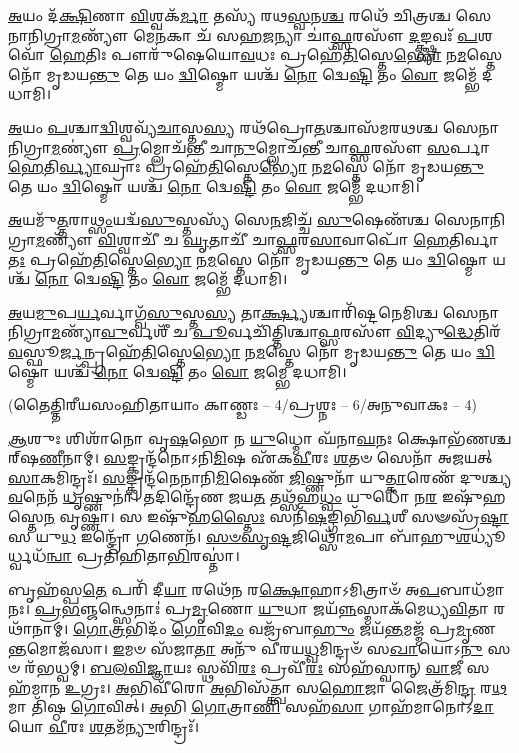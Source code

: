\-\ul{𑌅}\-𑌯𑌂 𑌦᳴\-\ul{𑌕𑍍𑌷𑌿}\-𑌣𑌾 \ul{𑌵𑌿}\-𑌶𑍍𑌵𑌕᳴\-\ul{𑌰𑍍𑌮𑌾} 𑌤𑌸𑍍𑌯᳴ 𑌰𑌥\-\ul{𑌸𑍍𑌵}\-𑌨\-\ul{𑌶𑍍𑌚} 𑌰𑌥𑍇᳴ 𑌚𑌿𑌤𑍍𑌰𑌶𑍍𑌚  𑌸𑍇𑌨𑌾𑌨𑌿𑌗𑍍𑌰𑌾\-\ul{𑌮}\-𑌣𑍍𑌯𑍗᳴
𑌮𑍇\-\ul{𑌨}\-𑌕𑌾 𑌚᳴ 𑌸𑌹\-\ul{𑌜}\-𑌨𑍍𑌯𑌾 𑌚𑌾॑\-\ul{𑌫𑍍𑌸}\-𑌰𑌸𑍗᳴ \ul{𑌦}\-𑌙𑍍𑌕𑍍𑌷𑍍𑌣𑌵𑌃᳴ \ul{𑌪}\-𑌶𑌵𑍋᳴ \ul{𑌹𑍇}\-𑌤𑌿𑌃 𑌪𑍗𑌰𑍁᳴𑌷𑍇𑌯𑍋\-\ul{𑌵}\-𑌧𑌃
𑌪𑍍𑌰𑌹𑍇᳴\-\ul{𑌤𑌿}\-𑌸𑍍𑌤𑍇\-\ul{𑌭𑍍𑌯𑍋} 𑌨\-\ul{𑌮}\-𑌸𑍍𑌤𑍇 𑌨𑍋᳴ 𑌮𑍃𑌡𑌯\-\ul{𑌨𑍍𑌤𑍁} 𑌤𑍇 𑌯𑌂 \ul{𑌦𑍍𑌵𑌿}\-𑌷𑍍𑌮𑍋 𑌯𑌶𑍍𑌚᳴ \ul{𑌨𑍋} 𑌦𑍍𑌵𑍇\-\ul{𑌷𑍍𑌟𑌿} 𑌤𑌂 \ul{𑌵𑍋}  𑌜𑌮𑍍𑌭𑍇᳴ 𑌦𑌧𑌾𑌮𑌿।

\-\ul{𑌅}\-𑌯𑌂 \ul{𑌪}\-𑌶𑍍𑌚𑌾\-\ul{𑌦𑍍𑌵𑌿}\-𑌶𑍍𑌵𑌵𑍍𑌯᳴\-\ul{𑌚𑌾}\-𑌸𑍍𑌤\-\ul{𑌸𑍍𑌯} 𑌰𑌥᳴𑌪𑍍𑌰𑍋\-\ul{𑌤}\-𑌶𑍍𑌚𑌾𑌸᳴𑌮𑌰𑌥𑌶𑍍𑌚 𑌸𑍇𑌨𑌾𑌨𑌿𑌗𑍍𑌰𑌾\-\ul{𑌮}\-𑌣𑍍𑌯𑍗॑
\-\ul{𑌪𑍍𑌰}\-𑌮𑍍𑌲𑍋𑌚᳴𑌨𑍍𑌤𑍀 𑌚𑌾\-\ul{𑌨𑍁}\-𑌮𑍍𑌲𑍋𑌚᳴𑌨𑍍𑌤𑍀 𑌚𑌾\-\ul{𑌫𑍍𑌸}\-𑌰𑌸𑍗᳴ \ul{𑌸}\-𑌰𑍍𑌪𑌾 \ul{𑌹𑍇}\-𑌤𑌿\-\ul{𑌰𑍍𑌵𑍍𑌯𑌾}\-𑌘𑍍𑌰𑌾𑌃 
𑌪𑍍𑌰𑌹𑍇᳴\-\ul{𑌤𑌿}\-𑌸𑍍𑌤𑍇\-\ul{𑌭𑍍𑌯𑍋} 𑌨\-\ul{𑌮}\-𑌸𑍍𑌤𑍇 𑌨𑍋᳴ 𑌮𑍃𑌡𑌯\-\ul{𑌨𑍍𑌤𑍁} 𑌤𑍇 𑌯𑌂 \ul{𑌦𑍍𑌵𑌿}\-𑌷𑍍𑌮𑍋 𑌯𑌶𑍍𑌚᳴ \ul{𑌨𑍋} 𑌦𑍍𑌵𑍇\-\ul{𑌷𑍍𑌟𑌿} 𑌤𑌂 \ul{𑌵𑍋}  𑌜𑌮𑍍𑌭𑍇᳴ 𑌦𑌧𑌾𑌮𑌿।

\-\ul{𑌅}\-𑌯𑌮𑍁᳴\-\ul{𑌤𑍍𑌤}\-𑌰𑌾\-\ul{𑌥𑍍𑌸𑌂}\-𑌯𑌦𑍍𑌵᳴\-\ul{𑌸𑍁}\-𑌸𑍍𑌤𑌸𑍍𑌯᳴ 𑌸𑍇\-\ul{𑌨}\-𑌜𑌿𑌚𑍍𑌚᳴ \ul{𑌸𑍁}\-𑌷𑍇𑌣᳴𑌶𑍍𑌚 𑌸𑍇𑌨𑌾𑌨𑌿𑌗𑍍𑌰𑌾\-\ul{𑌮}\-𑌣𑍍𑌯𑍗᳴
\-\ul{𑌵𑌿}\-𑌶𑍍𑌵𑌾𑌚𑍀᳴ 𑌚 \ul{𑌘𑍃}\-𑌤𑌾𑌚𑍀᳴ 𑌚𑌾\-\ul{𑌫𑍍𑌸}\-𑌰\-\ul{𑌸𑌾}\-𑌵𑌾𑌪𑍋᳴ \ul{𑌹𑍇}\-𑌤𑌿𑌰𑍍𑌵𑌾\-\ul{𑌤𑌃} 
𑌪𑍍𑌰𑌹𑍇᳴\-\ul{𑌤𑌿}\-𑌸𑍍𑌤𑍇\-\ul{𑌭𑍍𑌯𑍋} 𑌨\-\ul{𑌮}\-𑌸𑍍𑌤𑍇 𑌨𑍋᳴ 𑌮𑍃𑌡𑌯\-\ul{𑌨𑍍𑌤𑍁} 𑌤𑍇 𑌯𑌂 \ul{𑌦𑍍𑌵𑌿}\-𑌷𑍍𑌮𑍋 𑌯𑌶𑍍𑌚᳴ \ul{𑌨𑍋} 𑌦𑍍𑌵𑍇\-\ul{𑌷𑍍𑌟𑌿} 𑌤𑌂 \ul{𑌵𑍋}  𑌜𑌮𑍍𑌭𑍇᳴ 𑌦𑌧𑌾𑌮𑌿।

\-\ul{𑌅}\-𑌯\-\ul{𑌮𑍁}\-𑌪\-\ul{𑌰𑍍𑌯}\-𑌰𑍍𑌵𑌾𑌗𑍍𑌵᳴\-\ul{𑌸𑍁}\-𑌸𑍍𑌤\-\ul{𑌸𑍍𑌯} 𑌤𑌾\-\ul{𑌰𑍍𑌕𑍍𑌷𑍍𑌯}\-𑌶𑍍𑌚𑌾𑌰𑌿᳴𑌷𑍍𑌟𑌨𑍇𑌮𑌿𑌶𑍍𑌚  𑌸𑍇𑌨𑌾𑌨𑌿\-𑌗𑍍𑌰𑌾\-\ul{𑌮}\-𑌣𑍍𑌯𑌾᳴\-\ul{𑌵𑍁}\-𑌰𑍍𑌵𑌶𑍀᳴ 𑌚
\-\ul{𑌪𑍂}\-𑌰𑍍𑌵𑌚𑌿᳴𑌤𑍍𑌤𑌿𑌶𑍍𑌚𑌾\-\ul{𑌫𑍍𑌸}\-𑌰𑌸𑍗᳴ \ul{𑌵𑌿}\-𑌦𑍍𑌯𑍁\-\ul{𑌦𑍍𑌧𑍇}\-𑌤𑌿𑌰᳴\-\ul{𑌵}\-\-𑌸𑍍𑌫𑍂\-\ul{𑌰𑍍𑌜}\-𑌨𑍍𑌪𑍍𑌰𑌹𑍇᳴\-\ul{𑌤𑌿}\-𑌸𑍍𑌤𑍇\-\ul{𑌭𑍍𑌯𑍋}\-
𑌨\-\ul{𑌮}\-𑌸𑍍𑌤𑍇 𑌨𑍋᳴ 𑌮𑍃𑌡𑌯\-\ul{𑌨𑍍𑌤𑍁} 𑌤𑍇 𑌯𑌂 \ul{𑌦𑍍𑌵𑌿}\-𑌷𑍍𑌮𑍋 𑌯𑌶𑍍𑌚᳴ \ul{𑌨𑍋} 𑌦𑍍𑌵𑍇\-\ul{𑌷𑍍𑌟𑌿} 𑌤𑌂 \ul{𑌵𑍋}  𑌜𑌮𑍍𑌭𑍇 𑌦𑌧𑌾𑌮𑌿।


\centerline{\scriptsize (𑌤𑍈𑌤𑍍𑌤𑌿𑌰𑍀𑌯𑌸𑌂𑌹𑌿𑌤𑌾𑌯𑌾𑌂 𑌕𑌾𑌣𑍍𑌡𑌃 – 4/𑌪𑍍𑌰𑌶𑍍𑌨𑌃 – 6/𑌅𑌨𑍁𑌵𑌾𑌕𑌃 – 4)}

\-\ul{𑌆}\-𑌶𑍁𑌃 𑌶𑌿𑌶𑌾᳴𑌨𑍋 𑌵𑍃\-\ul{𑌷}\-𑌭𑍋 𑌨 \ul{𑌯𑍁}\-𑌧𑍍𑌮𑍋 𑌘᳴𑌨𑌾\-\ul{𑌘}\-𑌨𑌃 𑌕𑍍𑌷𑍋𑌭᳴𑌣𑌶𑍍𑌚𑌰𑍍‌𑌷\-\ul{𑌣𑍀}\-𑌨𑌾𑌮𑍍। \ul{𑌸}\-𑌙𑍍𑌕𑍍𑌰𑌨𑍍𑌦᳴𑌨𑍋𑌽𑌨𑌿\-\ul{𑌮𑌿}\-𑌷 𑌏᳴𑌕\-\ul{𑌵𑍀}\-𑌰𑌃 \ul{𑌶}\-𑌤𑍞 𑌸𑍇𑌨𑌾᳴ 𑌅𑌜𑌯𑌤𑍍 \ul{𑌸𑌾}\-𑌕𑌮𑌿𑌨𑍍𑌦𑍍𑌰𑌃᳴। \ul{𑌸}\-𑌙𑍍𑌕𑍍𑌰𑌨𑍍𑌦᳴𑌨𑍇𑌨𑌾𑌨𑌿\-\ul{𑌮𑌿}\-𑌷𑍇𑌣᳴ \ul{𑌜𑌿}\-𑌷𑍍𑌣𑍁𑌨𑌾᳴ 𑌯𑍁\-\ul{𑌤𑍍𑌕𑌾}\-𑌰𑍇𑌣᳴ 𑌦𑍁𑌶𑍍𑌚𑍍𑌯\-\ul{𑌵}\-𑌨𑍇𑌨᳴ \ul{𑌧𑍃}\-𑌷𑍍𑌣𑍁𑌨𑌾॑। 𑌤𑌦𑌿𑌨𑍍𑌦𑍍𑌰𑍇᳴𑌣 𑌜𑌯\-\ul{𑌤} 𑌤𑌥𑍍𑌸᳴𑌹\-\ul{𑌧𑍍𑌵𑌂} 𑌯𑍁𑌧𑍋᳴ 𑌨\-\ul{𑌰} 𑌇𑌷𑍁᳴𑌹𑌸𑍍𑌤𑍇\-\ul{𑌨} 𑌵𑍃𑌷𑍍𑌣𑌾॑। 𑌸 𑌇𑌷𑍁᳴𑌹\-\ul{𑌸𑍍𑌤𑍈𑌃} 𑌸𑌨𑌿᳴\-\ul{𑌷}\-𑌙𑍍𑌗𑌿𑌭𑌿᳴\-\ul{𑌰𑍍𑌵}\-𑌶𑍀 𑌸𑍟𑌸𑍍𑌰᳴\-\ul{𑌷𑍍𑌟𑌾} 𑌸 𑌯𑍁\-\ul{𑌧} 𑌇𑌨𑍍𑌦𑍍𑌰𑍋᳴ \ul{𑌗}\-𑌣𑍇𑌨᳴। \ul{𑌸}\-\-\ul{𑍞}\-\-\ul{𑌸𑍃}\-\-\ul{𑌷𑍍𑌟}\-𑌜𑌿𑌥𑍍𑌸𑍋᳴\-\ul{𑌮}\-𑌪𑌾 𑌬𑌾᳴𑌹𑍁\-\ul{𑌶}\-𑌧𑍍𑌯𑍂॑𑌰𑍍𑌧𑍍𑌵𑌧᳴\-\ul{𑌨𑍍𑌵𑌾} 𑌪𑍍𑌰𑌤𑌿᳴𑌹𑌿𑌤𑌾\-\ul{𑌭𑌿}\-𑌰𑌸𑍍𑌤𑌾॑।

𑌬𑍃𑌹᳴𑌸𑍍𑌪\-\ul{𑌤𑍇} 𑌪𑌰𑌿᳴ 𑌦𑍀\-\ul{𑌯𑌾} 𑌰𑌥𑍇᳴𑌨 𑌰\-\ul{𑌕𑍍𑌷𑍋}\-𑌹𑌾𑌽𑌮𑌿𑌤𑍍𑌰𑌾𑍞᳴ 𑌅\-\ul{𑌪}\-𑌬𑌾𑌧᳴𑌮𑌾𑌨𑌃। \ul{𑌪𑍍𑌰}\-\-\ul{𑌭}\-𑌞𑍍𑌜𑌨𑍍𑌥𑍍𑌸𑍇𑌨𑌾𑌃॑ 𑌪𑍍𑌰\-\ul{𑌮𑍃}\-𑌣𑍋 \ul{𑌯𑍁}\-𑌧𑌾 𑌜𑌯᳴\-\ul{𑌨𑍍𑌨}\-𑌸𑍍𑌮𑌾𑌕᳴𑌮𑍇𑌧𑍍𑌯\-\ul{𑌵𑌿}\-𑌤𑌾 𑌰𑌥𑌾᳴𑌨𑌾𑌮𑍍। \ul{𑌗𑍋}\-\-\ul{𑌤𑍍𑌰}\-𑌭𑌿𑌦𑌂᳴ \ul{𑌗𑍋}\-𑌵𑌿\-\ul{𑌦𑌂} 𑌵𑌜𑍍𑌰᳴𑌬𑌾\-\ul{𑌹𑍁𑌂} 𑌜𑌯᳴\-\ul{𑌨𑍍𑌤}\-𑌮𑌜𑍍𑌮᳴ 𑌪𑍍𑌰\-\ul{𑌮𑍃}\-𑌣\-\ul{𑌨𑍍𑌤}\-𑌮𑍋𑌜᳴𑌸𑌾। \ul{𑌇}\-𑌮𑍞 𑌸᳴𑌜𑌾\-\ul{𑌤𑌾} 𑌅𑌨𑍁᳴ 𑌵𑍀𑌰𑌯\-\ul{𑌧𑍍𑌵}\-𑌮𑌿𑌨𑍍𑌦𑍍𑌰𑍞᳴ 𑌸\-\ul{𑌖𑌾}\-𑌯𑍋𑌽\-\ul{𑌨𑍁} 𑌸𑍞 𑌰᳴𑌭𑌧𑍍𑌵𑌮𑍍। \ul{𑌬}\-\-\ul{𑌲}\-\-\ul{𑌵𑌿}\-\-\ul{𑌜𑍍𑌞𑌾}\-𑌯𑌃 𑌸𑍍𑌥𑌵𑌿᳴\-\ul{𑌰𑌃} 𑌪𑍍𑌰𑌵𑍀᳴\-\ul{𑌰𑌃} 𑌸𑌹᳴𑌸𑍍𑌵𑌾𑌨𑍍 \ul{𑌵𑌾}\-𑌜𑍀 𑌸𑌹᳴𑌮𑌾𑌨 \ul{𑌉}\-𑌗𑍍𑌰𑌃। \ul{𑌅}\-𑌭𑌿𑌵𑍀᳴𑌰𑍋 \ul{𑌅}\-𑌭𑌿𑌸᳴𑌤𑍍𑌤𑍍𑌵𑌾 𑌸\-\ul{𑌹𑍋}\-𑌜𑌾 𑌜𑍈𑌤𑍍𑌰᳴𑌮𑌿\-\ul{𑌨𑍍𑌦𑍍𑌰} 𑌰\-\ul{𑌥}\-𑌮𑌾 𑌤𑌿᳴𑌷𑍍𑌠 \ul{𑌗𑍋}\-𑌵𑌿𑌤𑍍। \ul{𑌅}\-𑌭𑌿 \ul{𑌗𑍋}\-𑌤𑍍𑌰𑌾\-\ul{𑌣𑌿} 𑌸𑌹᳴\-\ul{𑌸𑌾} 𑌗𑌾𑌹᳴𑌮𑌾𑌨𑍋𑌽\-\ul{𑌦𑌾}\-𑌯𑍋 \ul{𑌵𑍀}\-𑌰𑌃 \ul{𑌶}\-𑌤𑌮᳴\-\ul{𑌨𑍍𑌯𑍁}\-𑌰𑌿𑌨𑍍𑌦𑍍𑌰𑌃᳴।

